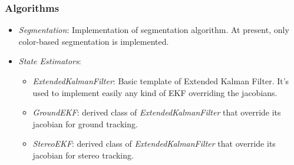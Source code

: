 	\subsubsection{Algorithms}
		\begin{itemize}
			\item \textit{Segmentation}: Implementation of segmentation algorithm. At present, only color-based segmentation is implemented.
			\item \textit{State Estimators}: 
			\begin{itemize}
				\item \textit{ExtendedKalmanFilter}: Basic template of Extended Kalman Filter. It's used to implement easily any kind of EKF overriding the jacobians.
				\item \textit{GroundEKF}: derived class of \textit{ExtendedKalmanFilter} that override its jacobian for ground tracking.
				\item \textit{StereoEKF}: derived class of \textit{ExtendedKalmanFilter} that override its jacobian for stereo tracking.
			\end{itemize}
		\end{itemize}